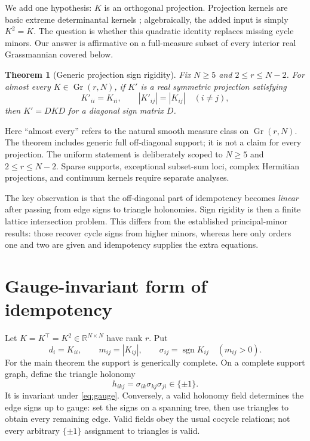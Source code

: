 \documentclass[11pt,a4paper]{article}
\newtheorem{theorem}{Theorem}[section]
\theoremstyle{definition}
\theoremstyle{remark}
\newcommand{\R}{\mathbb{R}}
\newcommand{\Gr}{\operatorname{Gr}}
\newcommand{\sgn}{\operatorname{sgn}}
\begin{document}
We add one hypothesis: $K$ is an orthogonal projection.  Projection kernels are basic
extreme determinantal kernels \citep{Lyons2003,HKPV2006}; algebraically, the added input is
simply $K^2=K$.  The question is whether this quadratic identity replaces missing cycle
minors.  Our answer is affirmative on a full-measure subset of every interior real
Grassmannian covered below.

\begin{theorem}[Generic projection sign rigidity]\label{thm:main}
Fix $N\ge5$ and $2\le r\le N-2$.  For almost every $K\in\Gr(r,N)$, if $K'$ is a real
symmetric projection satisfying
\[
 K'_{ii}=K_{ii},\qquad |K'_{ij}|=|K_{ij}|\quad(i\ne j),
\]
then $K'=DKD$ for a diagonal sign matrix $D$.
\end{theorem}

Here ``almost every'' refers to the natural smooth measure class on $\Gr(r,N)$.  The
theorem includes generic full off-diagonal support; it is not a claim for every projection.
The uniform statement is deliberately scoped to $N\ge5$ and $2\le r\le N-2$.  Sparse
supports, exceptional subset-sum loci, complex Hermitian projections, and continuum kernels
require separate analyses.

The key observation is that the off-diagonal part of idempotency becomes \emph{linear} after
passing from edge signs to triangle holonomies.  Sign rigidity is then a finite lattice
intersection problem.  This differs from the established principal-minor results: those
recover cycle signs from higher minors, whereas here only orders one and two are given and
idempotency supplies the extra equations.

\section{Gauge-invariant form of idempotency}

Let $K=K^\top=K^2\in\R^{N\times N}$ have rank $r$.  Put
\begin{equation}
 d_i=K_{ii},\qquad m_{ij}=|K_{ij}|,
 \qquad \sigma_{ij}=\sgn K_{ij}\quad(m_{ij}>0).
\end{equation}
For the main theorem the support is generically complete.  On a complete support graph,
define the triangle holonomy
\begin{equation}
 h_{ikj}=\sigma_{ik}\sigma_{kj}\sigma_{ji}\in\{\pm1\}.
 \label{eq:h}
\end{equation}
It is invariant under \eqref{eq:gauge}.  Conversely, a valid holonomy field determines the
edge signs up to gauge: set the signs on a spanning tree, then use triangles to obtain every
remaining edge.  Valid fields obey the usual cocycle relations; not every arbitrary
$\{\pm1\}$ assignment to triangles is valid.
\end{document}
